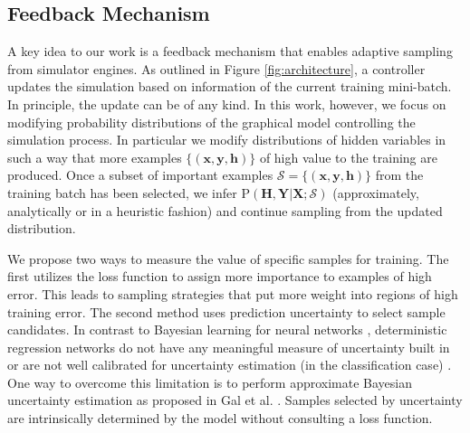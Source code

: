 \documentclass[conference]{IEEEtran}
\begin{document}
\subsection{Feedback Mechanism}
    \label{sec:feedback}
    A key idea to our work is a feedback mechanism that enables adaptive sampling from simulator engines. As outlined in Figure \ref{fig:architecture}, a controller updates the simulation based on information of the current training mini-batch. In principle, the update can be of any kind. In this work, however, we focus on modifying probability distributions of the graphical model controlling the simulation process. In particular we modify distributions of hidden variables in such a way that more examples $\{(\textbf{x},\textbf{y},\textbf{h})\}$ of high value to the training are produced. Once a subset of important examples $\mathcal{S} = \{(\textbf{x},\textbf{y},\textbf{h})\}$ from the training batch has been selected, we infer $\mathrm{P}(\textbf{H},\textbf{Y} \lvert \textbf{X};\mathcal{S})$ (approximately, analytically or in a heuristic fashion) and continue sampling from the updated distribution.

    We propose two ways to measure the value of specific samples for training. The first utilizes the loss function to assign more importance to examples of high error. This leads to sampling strategies that put more weight into regions of high training error. The second method uses prediction uncertainty to select sample candidates. In contrast to Bayesian learning for neural networks \cite{neal2012bayesian}, deterministic regression networks do not have any meaningful measure of uncertainty built in or are not well calibrated for uncertainty estimation (in the classification case) \cite{guo2017calibration}. One way to overcome this limitation is to perform approximate Bayesian uncertainty estimation as proposed in Gal et al. \cite{gal2015dropout}. Samples selected by uncertainty are intrinsically determined by the model without consulting a loss function.
    
\end{document}
